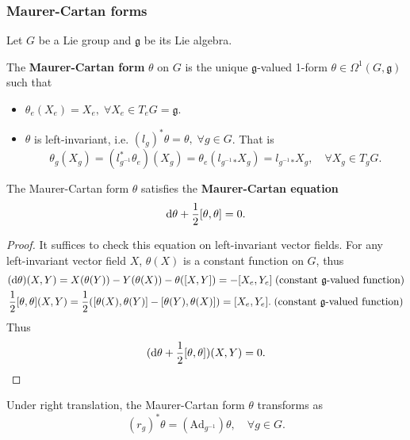 \subsubsection*{Maurer-Cartan forms}
Let $G$ be a Lie group and $\mathfrak{g}$ be its Lie algebra.
\begin{definition}
    The \textbf{Maurer-Cartan form} $\theta$ on $G$ is the unique $\mathfrak{g}$-valued 1-form $\theta\in\Omega^1(G,\mathfrak{g})$ such that
    \begin{itemize}
        \item $\theta_e(X_e) = X_e,\;\forall X_e\in T_eG = \mathfrak{g}$.
        \item $\theta$ is left-invariant, i.e. $(l_g)^*\theta = \theta,\;\forall g\in G$. That is
        \begin{equation*}
            \theta_g(X_g) = (l_{g^{-1}}^*\theta_e)(X_g) = \theta_e(l_{g^{-1}}{}_*X_g) = l_{g^{-1}}{}_*X_g, \quad \forall X_g\in T_gG. 
        \end{equation*}
    \end{itemize}
\end{definition}
\begin{proposition}
    The Maurer-Cartan form $\theta$ satisfies the \textbf{Maurer-Cartan equation}
    \begin{equation*}
        {\rm d}\theta + \frac{1}{2}[\theta,\theta] = 0.
    \end{equation*}
\end{proposition}
\begin{proof}
    It suffices to check this equation on left-invariant vector fields. 
    For any left-invariant vector field $X$, $\theta(X)$ is a constant function on $G$, thus 
    \begin{gather*}
        ({\rm d}\theta)(X,Y) = X(\theta(Y)) - Y(\theta(X)) - \theta([X,Y]) = -[X_e,Y_e] \;(\text{constant }\mathfrak{g}\text{-valued function}) \\
        \frac{1}{2}[\theta,\theta](X,Y) = \frac{1}{2}([\theta(X),\theta(Y)] - [\theta(Y),\theta(X)]) = [X_e,Y_e]. \;(\text{constant }\mathfrak{g}\text{-valued function})
    \end{gather*}
    Thus
    \begin{equation*}
        ({\rm d}\theta + \frac{1}{2}[\theta,\theta])(X,Y) = 0. \qedhere
    \end{equation*}
\end{proof}
\begin{proposition}
    Under right translation, the Maurer-Cartan form $\theta$ transforms as
    \begin{equation*}
        (r_g)^*\theta = (\mathrm{Ad}_{g^{-1}})\theta, \quad \forall g\in G.
    \end{equation*}
\end{proposition}
